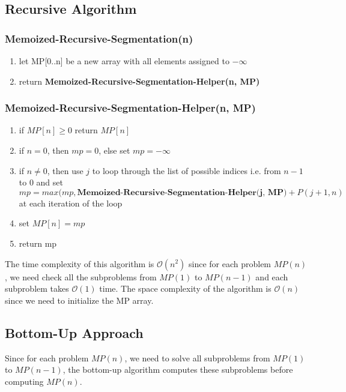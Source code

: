 \documentclass[10pt,a4paper]{article}
\begin{document}
\subsection{Recursive Algorithm}
\subsubsection*{Memoized-Recursive-Segmentation(n)}
\begin{enumerate}
\item let MP[0..n] be a new array with all elements assigned to $-\infty$
\item return \textbf{Memoized-Recursive-Segmentation-Helper(n, MP)}
\end{enumerate}
\subsubsection*{Memoized-Recursive-Segmentation-Helper(n, MP)}
\begin{enumerate}
\item if $MP[n]\geq 0$ return $MP[n]$
\item if $n=0$, then $mp = 0$, else set $mp = -\infty$
\item if $n\neq 0$, then use $j$ to loop through the list of possible indices i.e. from $n-1$ to 0 and set $mp = max(mp, \textbf{Memoized-Recursive-Segmentation-Helper(j, MP)} + P(j+1, n)$ at each iteration of the loop
\item set $MP[n] = mp$
\item return mp
\end{enumerate}

The time complexity of this algorithm is $\mathcal{O}(n^2)$ since for each problem $MP(n)$, we need check all the subproblems from $MP(1)$ to $MP(n-1)$ and each subproblem takes $\mathcal{O}(1)$ time. The space complexity of the algorithm is $\mathcal{O}(n)$ since we need to initialize the MP array.

\subsection{Bottom-Up Approach}
Since for each problem $MP(n)$, we need to solve all subproblems from $MP(1)$ to $MP(n-1)$, the bottom-up algorithm computes these subproblems before computing $MP(n)$.
\end{document}
